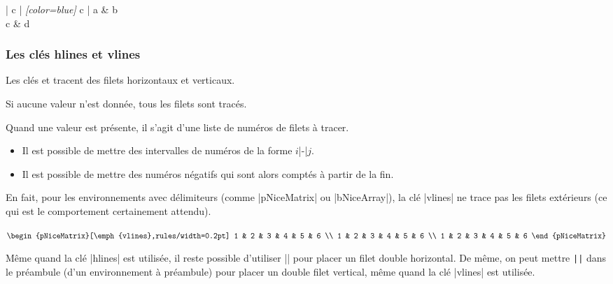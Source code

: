 \documentclass[dvipsnames]{article}
\begin{document}
\medskip
\begin{Code}[width=10cm,show-output,no-cell-nodes]
\begin{NiceTabular}{| c | \emph{[color=blue]} c |}
\Hline
a & b \\
\emph{\Hline[color=red]}
c & d \\
\Hline
\end{NiceTabular}
\end{Code}


\medskip
\subsubsection{Les clés hlines et vlines}


\medskip
Les clés  et  tracent des filets
horizontaux et verticaux.

Si aucune valeur n'est donnée, tous les filets sont tracés.

\medskip
Quand une valeur est présente, il s'agit d'une liste de numéros de filets à tracer.
\begin{itemize}
\item Il est possible de mettre des intervalles de numéros de la forme $i$|-|$j$.

\item Il est possible de mettre des numéros négatifs qui sont alors comptés à
partir de la fin.
\end{itemize}


En fait, pour les environnements avec délimiteurs (comme |{pNiceMatrix}| ou
|{bNiceArray}|), la clé |vlines| ne trace pas les filets extérieurs (ce qui est
le comportement certainement attendu).

\medskip
\begin{Code}[width=10.6cm,show-output,no-cell-nodes]
$\begin{pNiceMatrix}[\emph{vlines},rules/width=0.2pt]
1 & 2 & 3 & 4 & 5 & 6 \\
1 & 2 & 3 & 4 & 5 & 6 \\
1 & 2 & 3 & 4 & 5 & 6
\end{pNiceMatrix}$
\end{Code}


\medskip
Même quand la clé |hlines| est utilisée, il reste possible d'utiliser
|\Hline\Hline| pour placer un filet double horizontal. De même,
on peut mettre \verb+||+ dans le préambule (d'un environnement à préambule) pour
placer un double filet vertical, même quand la clé |vlines| est utilisée.
\end{document}
